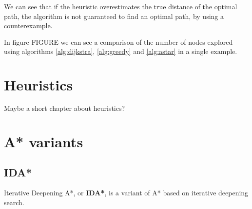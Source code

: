 \documentclass[12pt]{report}
\newtheorem{theorem}{Theorem}[chapter]
\begin{document}
%
%

We can see that if the heuristic overestimates the true distance of the optimal path, the algorithm is not guaranteed to find an optimal path, by using a counterexample. %

In figure FIGURE we can see a comparison of the number of nodes explored using algorithms \ref{alg:dijkstra}, \ref{alg:greedy} and \ref{alg:astar} in a single example.



\chapter{Heuristics}
Maybe a short chapter about heuristics?

\chapter{A* variants}

\section{IDA*}
Iterative Deepening A*, or \textbf{IDA*}, is a variant of A* based on iterative deepening search. 
\end{document}
